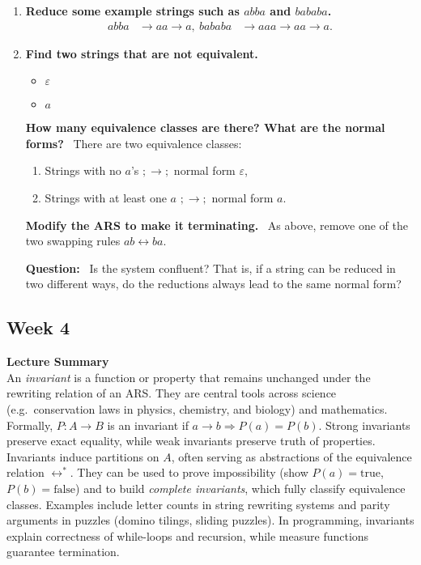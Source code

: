 \documentclass{article}
\theoremstyle{theorem}
\theoremstyle{definition}
\theoremstyle{remark}
\begin{document}
\begin{enumerate}
  \item \textbf{Reduce some example strings such as $abba$ and $bababa$.}
  \begin{align}
    abba &\to aa \to a, \
    bababa &\to aaa \to aa \to a.
  \end{align}

  \item \textbf{Find two strings that are not equivalent.}
  \begin{itemize}
    \item $\varepsilon$
    \item $a$
  \end{itemize}

   \textbf{How many equivalence classes are there? What are the normal forms?} \
  There are two equivalence classes:
  \begin{enumerate}
    \item Strings with no $a$’s $;\to;$ normal form $\varepsilon$,
    \item Strings with at least one $a$ $;\to;$ normal form $a$.
  \end{enumerate}

 \textbf{Modify the ARS to make it terminating.} \
  As above, remove one of the two swapping rules $ab \leftrightarrow ba$.

   \textbf{Question:} \
  Is the system confluent? That is, if a string can be reduced in two different ways, do the reductions always lead to the same normal form?

\end{enumerate}

\subsection{Week 4}
\textbf{Lecture Summary}
\\An \emph{invariant} is a function or property that remains unchanged under the rewriting relation of an ARS. 
They are central tools across science (e.g.\ conservation laws in physics, chemistry, and biology) and mathematics. 
Formally, $P:A\to B$ is an invariant if $a\to b \Rightarrow P(a)=P(b)$. 
Strong invariants preserve exact equality, while weak invariants preserve truth of properties. 
Invariants induce partitions on $A$, often serving as abstractions of the equivalence relation $\leftrightarrow^\ast$. 
They can be used to prove impossibility (show $P(a)=\text{true}$, $P(b)=\text{false}$) and to build \emph{complete invariants}, which fully classify equivalence classes. 
Examples include letter counts in string rewriting systems and parity arguments in puzzles (domino tilings, sliding puzzles). 
In programming, invariants explain correctness of while-loops and recursion, while measure functions guarantee termination.
\end{document}
